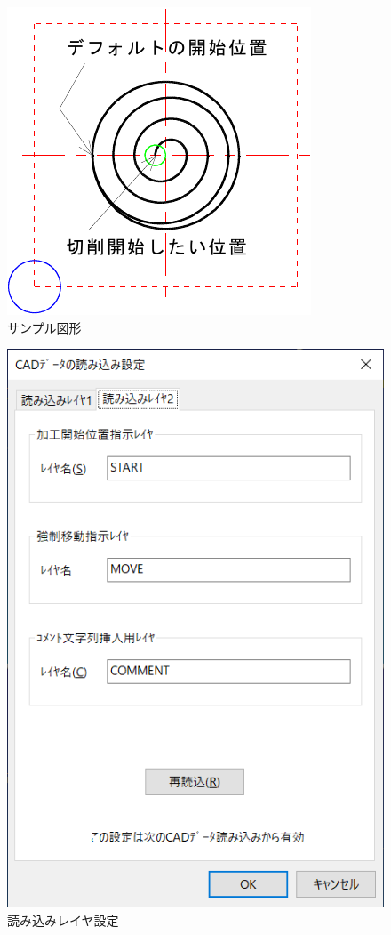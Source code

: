 \begin{minipage}{0.5\textwidth}
\begin{figure}[H]
\centering
\includegraphics{No3/fig/start-crop.pdf}
\caption{サンプル図形}
\label{fig:sample3.pdf}
\end{figure}
\end{minipage}
\begin{minipage}{0.5\textwidth}
\begin{figure}[H]
\centering
\includegraphics[scale=0.7]{No3/fig/ReadSetup3.png}
\caption{読み込みレイヤ設定}
\label{fig:ReadSetup3.png}
\end{figure}
\end{minipage}

